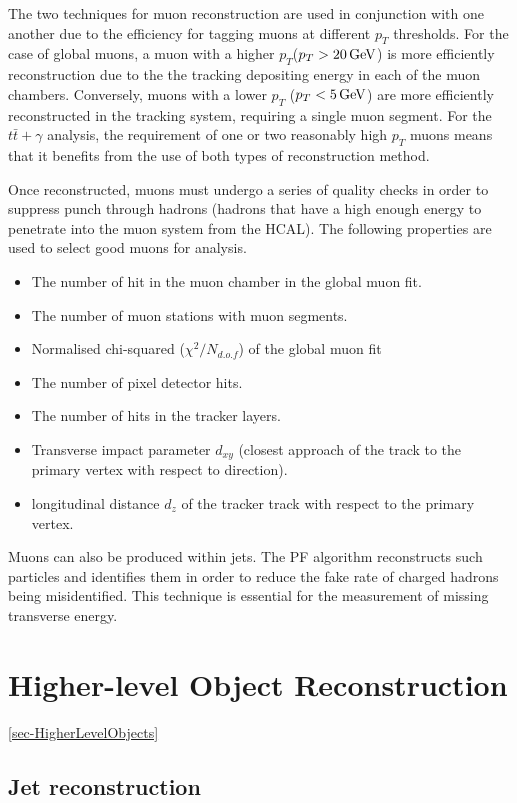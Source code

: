 The two techniques for muon reconstruction are used in conjunction with one another due to the efficiency for tagging muons at different $p_T$ thresholds. For the case of global muons, a muon with a higher $p_T$($p_T > 20 \,\text{Ge\hspace{-.08em}V}$) is more efficiently reconstruction due to the the tracking depositing energy in each of the muon chambers. Conversely, muons with a lower $p_T$ ($p_T < 5 \,\text{Ge\hspace{-.08em}V}$) are more efficiently reconstructed in the tracking system, requiring a single muon segment. For the $t\bar{t}+\gamma$ analysis, the requirement of one or two reasonably high $p_T$ muons means that it benefits from the use of both types of reconstruction method.

Once reconstructed, muons must undergo a series of quality checks in order to suppress punch through hadrons (hadrons that have a high enough energy to penetrate into the muon system from the HCAL). The following properties are used to select good muons for analysis.

\begin{itemize}
	\item The number of hit in the muon chamber in the global muon fit.
	\item The number of muon stations with muon segments.
	\item Normalised chi-squared ($\chi^2/N_{d.o.f}$) of the global muon fit
	\item The number of pixel detector hits.
	\item The number of hits in the tracker layers.
	\item Transverse impact parameter $d_{xy}$ (closest approach of the track to the primary vertex with respect to direction).
	\item longitudinal distance $d_z$ of the tracker track with respect to the primary vertex.
\end{itemize}

Muons can also be produced within jets. The PF algorithm reconstructs such particles and identifies them in order to reduce the fake rate of charged hadrons being misidentified. This technique is essential for the measurement of missing transverse energy. 

\section{Higher-level Object Reconstruction} \ref{sec-HigherLevelObjects}

\subsection{Jet reconstruction} \label{subsec-JetReconstruction}

